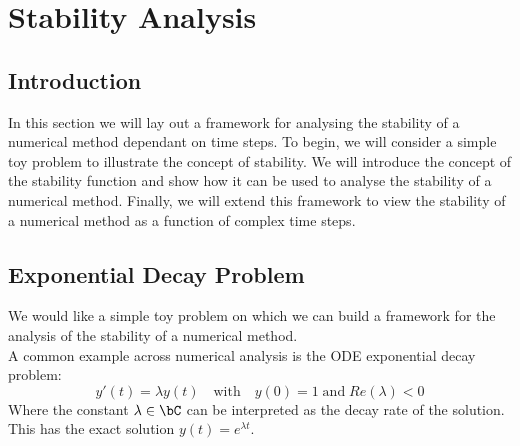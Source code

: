 \section{Stability Analysis}

\subsection{Introduction}
In this section we will lay out a framework for analysing the stability of a numerical method dependant on time steps.
To begin, we will consider a simple toy problem to illustrate the concept of stability.
We will introduce the concept of the stability function and show how it can be used to analyse the stability of a numerical method.
Finally, we will extend this framework to view the stability of a numerical method as a function of complex time steps.



\subsection{Exponential Decay Problem}

\par We would like a simple toy problem on which we can build a framework for the analysis of the stability of a numerical method.\\
A common example across numerical analysis is the ODE exponential decay problem: 
\[y'(t) = \lambda y(t) \quad \text{with} \quad y(0) = 1 \;\text{and}\; Re(\lambda) < 0\]
Where the constant $\lambda \in \bC$ can be interpreted as the decay rate of the solution.\\
This has the exact solution $y(t) = e^{\lambda t}$.\\


